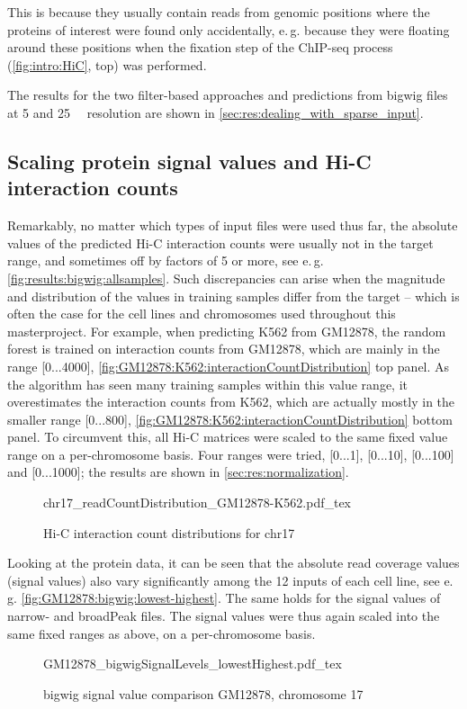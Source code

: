 This is because they usually contain reads from genomic positions where the proteins of interest
were found only accidentally, 
e.\,g. because they were floating around these positions when the fixation step of the ChIP-seq process
(\autoref{fig:intro:HiC}, top) was performed.

The results for the two filter-based approaches and predictions from bigwig files at 5 and \SI{25}{\kilo\bp} resolution 
are shown in \autoref{sec:res:dealing_with_sparse_input}.

\subsection{Scaling protein signal values and Hi-C interaction counts}
Remarkably, no matter which types of input files were used thus far, 
the absolute values of the predicted Hi-C interaction counts were usually not in the target range, 
and sometimes off by factors of 5 or more, see e.\,g. \autoref{fig:results:bigwig:allsamples}. 
Such discrepancies can arise when the magnitude and distribution of the values in training samples differ from 
the target -- which is often the case for the cell lines and chromosomes used throughout this masterproject.
For example, when predicting K562 from GM12878, 
the random forest is trained on interaction counts from GM12878, 
which are mainly in the range [0...4000], \autoref{fig:GM12878:K562:interactionCountDistribution} top panel.
As the algorithm has seen many training samples within this value range,
it overestimates the interaction counts from K562, 
which are actually mostly in the smaller range [0...800],
\autoref{fig:GM12878:K562:interactionCountDistribution} bottom panel.
To circumvent this, all Hi-C matrices were scaled to the same fixed value range on a per-chromosome basis.
Four ranges were tried, [0...1], [0...10], [0...100] and [0...1000]; the results are shown in \autoref{sec:res:normalization}.
\begin{figure}
 \small
 \centering
 {chr17_readCountDistribution_GM12878-K562.pdf_tex}
 \caption{Hi-C interaction count distributions for chr17}
 \label{fig:GM12878:K562:interactionCountDistribution}
\end{figure}

Looking at the protein data, it can be seen that the absolute read coverage values (signal values)
also vary significantly among the 12 inputs of each cell line, see e.\,g. \autoref{fig:GM12878:bigwig:lowest-highest}.
The same holds for the signal values of narrow- and broadPeak files.
The signal values were thus again scaled into the same fixed ranges as above, on a per-chromosome basis.
\begin{figure}
 \scriptsize
 \centering
 {GM12878_bigwigSignalLevels_lowestHighest.pdf_tex}
 \caption{bigwig signal value comparison GM12878, chromosome 17}
 \label{fig:GM12878:bigwig:lowest-highest}
\end{figure}

